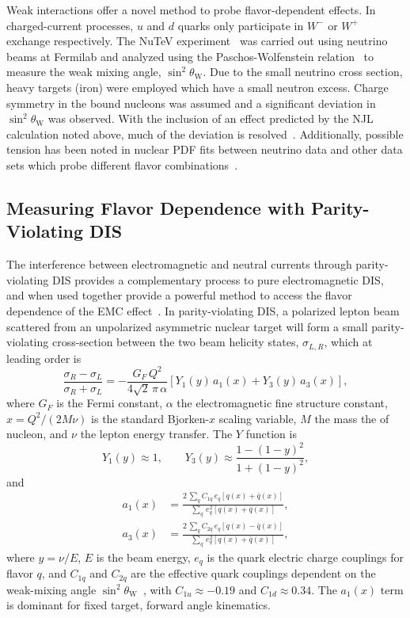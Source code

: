 Weak interactions offer a novel method to probe flavor-dependent effects.  In charged-current processes, $u$ and $d$ quarks only participate in $W^-$ or $W^+$ exchange respectively. The NuTeV experiment~\cite{Zeller:2001hh} was carried out using neutrino beams at Fermilab and analyzed using the Paschos-Wolfenstein relation~\cite{Paschos:1972kj} to measure the weak mixing angle, $\sin^2\theta_\mathrm{W}$.  Due to the small neutrino cross section, heavy targets (iron) were employed which have a small neutron excess.  Charge symmetry in the bound nucleons was assumed and a significant deviation in $\sin^2\theta_\mathrm{W}$ was observed.  With the inclusion of an effect predicted by the NJL calculation noted above, much of the deviation is resolved~\cite{Cloet:2009qs,Bentz:2009yy}.  Additionally, possible tension has been noted in nuclear PDF fits between neutrino data and other data sets which probe different flavor combinations~\cite{Schienbein:2009kk}.

\subsection{Measuring Flavor Dependence with Parity-Violating DIS}
%
The interference between electromagnetic and neutral currents through parity-violating DIS provides a complementary process to pure electromagnetic DIS, and when used together provide a powerful method to access the flavor dependence of the EMC effect~\cite{Cloet:2012td}. In parity-violating DIS, a polarized lepton beam scattered from an unpolarized asymmetric nuclear target will form a small parity-violating cross-section between the two beam helicity states, $\sigma_{L,R}$, which at leading order is 
%
\begin{equation}
\frac{ \sigma_R - \sigma_L }{\sigma_R + \sigma_L} = -\frac{G_F\,Q^2}{4 \sqrt{2}\, \pi\, \alpha} 
\left[ Y_1(y)\,a_1(x) + Y_3(y)\,a_3(x) \right],
\label{eq:phy:apv}
\end{equation}
%
where $G_F$ is the Fermi constant, $\alpha$ the electromagnetic fine structure constant, $x = Q^2/(2M\nu)$ is the standard Bjorken-$x$ scaling variable, $M$ the mass the of nucleon, and $\nu$ the lepton energy transfer.  The $Y$ function is
%
\begin{equation}
Y_1(y) \approx 1, \qquad Y_3(y) \approx \frac{1 - (1-y)^2}{1 + (1-y)^2},
\end{equation}
%
and
%
\begin{align}
a_1(x) &= \frac{2\,\sum_q C_{1q}\, e_q\left[q(x) + \bar{q}(x)\right]}
{\sum_q\, e_q^2\left[q(x) + \bar{q}(x)\right]}, \\
a_3(x) &= \frac{2\,\sum_q C_{2q}\, e_q\left[q(x) - \bar{q}(x)\right]}
{\sum_q\, e_q^2\left[q(x) + \bar{q}(x)\right]},
\end{align}
%
where $y=\nu/E$, $E$ is the beam energy, $e_q$ is the quark electric charge couplings for flavor $q$, and $C_{1q}$ and $C_{2q}$ are the effective quark couplings dependent on the weak-mixing angle $\sin^2\theta_\mathrm{W}$~\cite{Patrignani:2016xqp}, with $C_{1u} \approx -0.19$ and $C_{1d} \approx 0.34$. The $a_1(x)$ term is dominant for fixed target, forward angle kinematics. 

